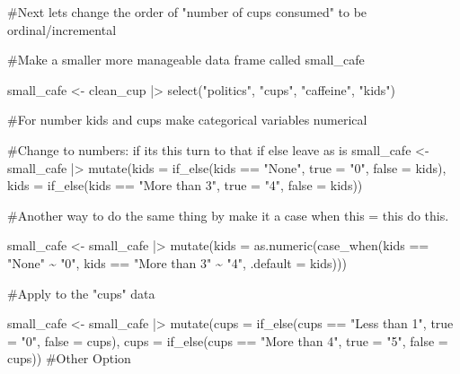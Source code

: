 \documentclass[
  letterpaper,
  DIV=11,
  numbers=noendperiod]{scrartcl}
\newenvironment{Shaded}{\begin{snugshade}}{\end{snugshade}}
\newcommand{\AttributeTok}[1]{\textcolor[rgb]{0.40,0.45,0.13}{#1}}
\newcommand{\CommentTok}[1]{\textcolor[rgb]{0.37,0.37,0.37}{#1}}
\newcommand{\FunctionTok}[1]{\textcolor[rgb]{0.28,0.35,0.67}{#1}}
\newcommand{\NormalTok}[1]{\textcolor[rgb]{0.00,0.23,0.31}{#1}}
\newcommand{\OtherTok}[1]{\textcolor[rgb]{0.00,0.23,0.31}{#1}}
\newcommand{\SpecialCharTok}[1]{\textcolor[rgb]{0.37,0.37,0.37}{#1}}
\newcommand{\StringTok}[1]{\textcolor[rgb]{0.13,0.47,0.30}{#1}}
\begin{document}
\begin{Shaded}
\begin{Highlighting}[]
\CommentTok{\#Next let\textquotesingle{}s change the order of "number of cups consumed" to be ordinal/incremental}


\CommentTok{\#Make a smaller more manageable data frame called small\_cafe}

\NormalTok{small\_cafe }\OtherTok{\textless{}{-}}\NormalTok{ clean\_cup }\SpecialCharTok{|\textgreater{}} 
  \FunctionTok{select}\NormalTok{(}\StringTok{"politics"}\NormalTok{, }\StringTok{"cups"}\NormalTok{, }\StringTok{"caffeine"}\NormalTok{, }\StringTok{"kids"}\NormalTok{)}

\CommentTok{\#For number kids and cups make categorical variables numerical}

\CommentTok{\#Change to numbers: if its this turn to that if else leave as is}
\NormalTok{small\_cafe }\OtherTok{\textless{}{-}}\NormalTok{ small\_cafe }\SpecialCharTok{|\textgreater{}} 
  \FunctionTok{mutate}\NormalTok{(}\AttributeTok{kids =} \FunctionTok{if\_else}\NormalTok{(kids }\SpecialCharTok{==} \StringTok{"None"}\NormalTok{,}
                        \AttributeTok{true =} \StringTok{"0"}\NormalTok{,}
                        \AttributeTok{false =}\NormalTok{ kids),}
         \AttributeTok{kids =} \FunctionTok{if\_else}\NormalTok{(kids }\SpecialCharTok{==} \StringTok{"More than 3"}\NormalTok{,}
                        \AttributeTok{true =} \StringTok{"4"}\NormalTok{,}
                        \AttributeTok{false =}\NormalTok{ kids))}

\CommentTok{\#Another way to do the same thing by make it a case when this = this do this.}
 
\NormalTok{small\_cafe }\OtherTok{\textless{}{-}}\NormalTok{ small\_cafe }\SpecialCharTok{|\textgreater{}} 
  \FunctionTok{mutate}\NormalTok{(}\AttributeTok{kids =} \FunctionTok{as.numeric}\NormalTok{(}\FunctionTok{case\_when}\NormalTok{(kids }\SpecialCharTok{==} \StringTok{"None"} \SpecialCharTok{\textasciitilde{}} \StringTok{"0"}\NormalTok{, }
\NormalTok{                          kids }\SpecialCharTok{==} \StringTok{"More than 3"} \SpecialCharTok{\textasciitilde{}} \StringTok{"4"}\NormalTok{,}
                          \AttributeTok{.default =}\NormalTok{ kids)))}

\CommentTok{\#Apply to the "cups" data}

\NormalTok{small\_cafe }\OtherTok{\textless{}{-}}\NormalTok{ small\_cafe }\SpecialCharTok{|\textgreater{}} 
  \FunctionTok{mutate}\NormalTok{(}\AttributeTok{cups =} \FunctionTok{if\_else}\NormalTok{(cups }\SpecialCharTok{==} \StringTok{"Less than 1"}\NormalTok{,}
                        \AttributeTok{true =} \StringTok{"0"}\NormalTok{,}
                        \AttributeTok{false =}\NormalTok{ cups),}
         \AttributeTok{cups =} \FunctionTok{if\_else}\NormalTok{(cups }\SpecialCharTok{==} \StringTok{"More than 4"}\NormalTok{,}
                        \AttributeTok{true =} \StringTok{"5"}\NormalTok{,}
                        \AttributeTok{false =}\NormalTok{ cups))}
\CommentTok{\#Other Option}
 

\end{Highlighting}
\end{Shaded}
\end{document}
